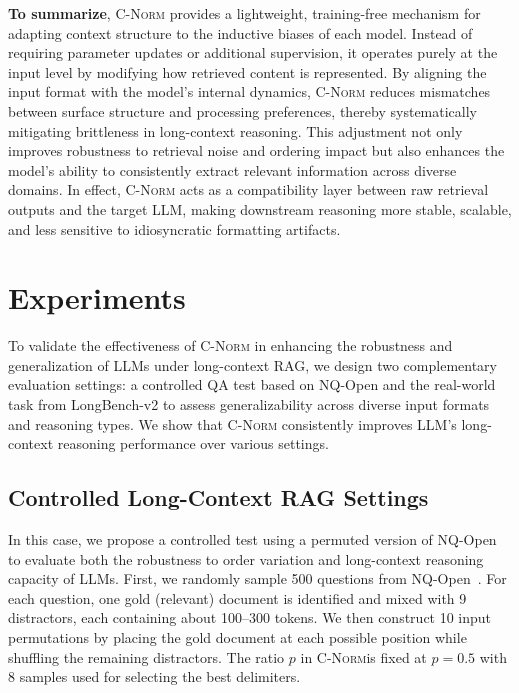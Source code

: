 \documentclass{article} %
\newcommand{\cnorm}{\textsc{C-Norm}}
\begin{document}
\textbf{To summarize}, \cnorm{} provides a lightweight, training-free mechanism for adapting context structure to the inductive biases of each model. Instead of requiring parameter updates or additional supervision, it operates purely at the input level by modifying how retrieved content is represented. By aligning the input format with the model’s internal dynamics, \cnorm{} reduces mismatches between surface structure and processing preferences, thereby systematically mitigating brittleness in long-context reasoning. This adjustment not only improves robustness to retrieval noise and ordering impact but also enhances the model’s ability to consistently extract relevant information across diverse domains. In effect, \cnorm{} acts as a compatibility layer between raw retrieval outputs and the target LLM, making downstream reasoning more stable, scalable, and less sensitive to idiosyncratic formatting artifacts.


\section{Experiments}\label{sec:exp}
To validate the effectiveness of \cnorm{} in enhancing the robustness and generalization of LLMs under long-context RAG, we design two complementary evaluation settings: a controlled QA test based on NQ-Open and the real-world task from LongBench-v2 to assess generalizability across diverse input formats and reasoning types. We show that \cnorm{} consistently improves LLM's long-context reasoning performance over various settings.

\subsection{Controlled Long-Context RAG Settings}
In this case, we propose a controlled test using a permuted version of NQ-Open to evaluate both the robustness to order variation and long-context reasoning capacity of LLMs.
First, we randomly sample 500 questions from NQ-Open~\citep{DBLP:journals/tacl/LiuLHPBPL24}. For each question, one gold (relevant) document is identified and mixed with 9 distractors, each containing about 100–300 tokens. We then construct 10 input permutations by placing the gold document at each possible position while shuffling the remaining distractors. The ratio $p$ in \cnorm is fixed at $p=0.5$ with 8 samples used for selecting the best delimiters.
\end{document}
